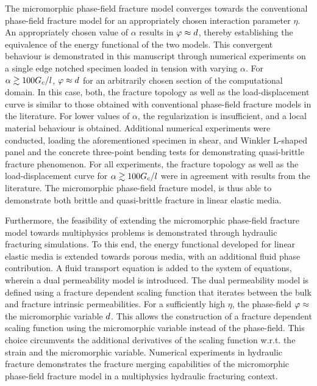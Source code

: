 \documentclass[11pt]{article}
\begin{document}
The micromorphic phase-field fracture model converges towards the conventional phase-field fracture model for an appropriately chosen interaction parameter $\eta$. An appropriately chosen value of $\alpha$ results in $\hbox{$\varphi$} \approx \hbox{$d$}$, thereby establishing the equivalence of the energy functional of the two models. This convergent behaviour is demonstrated in this manuscript through numerical experiments on a single edge notched specimen loaded in tension with varying $\alpha$. For $\alpha \gtrsim 100 \hbox{$G_c$} / l$, $\hbox{$\varphi$} \approx \hbox{$d$}$ for an arbitrarily chosen section of the computational domain. In this case, both, the fracture topology as well as the load-displacement curve is similar to those obtained with conventional phase-field fracture models in the literature. For lower values of $\alpha$, the regularization is insufficient, and a local material behaviour is obtained. Additional numerical experiments were conducted, loading the aforementioned specimen in shear, and Winkler L-shaped panel and the concrete three-point bending tests for demonstrating quasi-brittle fracture phenomenon. For all experiments, the fracture topology as well as the load-displacement curve for $\alpha \gtrsim 100 \hbox{$G_c$} / l$ were in agreement with results from the literature. The micromorphic phase-field fracture model, is thus able to demonstrate both brittle and quasi-brittle fracture in linear elastic media.

Furthermore, the feasibility of extending the micromorphic phase-field fracture model towards multiphysics problems is demonstrated through hydraulic fracturing simulations. To this end, the energy functional developed for linear elastic media is extended towards porous media, with an additional fluid phase contribution. A fluid transport equation is added to the system of equations, wherein a dual permeability model is introduced. The dual permeability model is defined using a fracture dependent scaling function that iterates between the bulk and fracture intrinsic permeabilities. For a sufficiently high $\eta$, the phase-field $\hbox{$\varphi$} \approx$ the micromorphic variable $\hbox{$d$}$. This allows the construction of a fracture dependent scaling function using the micromorphic variable instead of the phase-field. This choice circumvents the additional derivatives of the scaling function w.r.t. the strain and the micromorphic variable. Numerical experiments in hydraulic fracture demonstrates the fracture merging capabilities of the micromorphic phase-field fracture model in a multiphysics hydraulic fracturing context.
\end{document}
